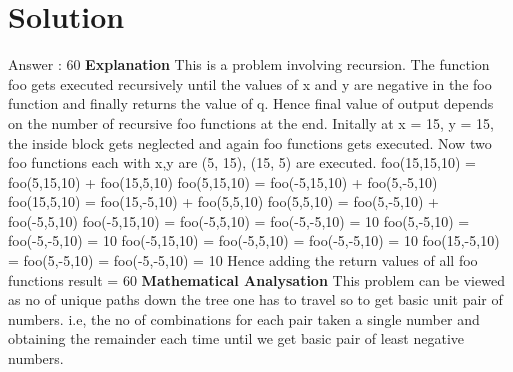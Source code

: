 \documentclass[journal,12pt,twocolumn]{IEEEtran}
\begin{document}
\section{Solution}
Answer : 60
\newline
\newline
\textbf{Explanation}
\newline
\newline
This is a problem involving recursion.
The function foo gets executed recursively until the values of x and y are negative in the foo function and finally returns the value of q. Hence final value of output depends on the number of recursive foo functions at the end. 
\newline
\newline
\newline
\newline
\newline
\newline
Initally at x = 15, y = 15, the inside block gets neglected and again foo functions gets executed.
\newline
\newline
Now two foo functions each with x,y are (5, 15),  (15, 5) are executed.
foo(15,15,10) =  foo(5,15,10) + foo(15,5,10)
\newline
\newline
foo(5,15,10)   =  foo(-5,15,10) + foo(5,-5,10)
\newline
\newline
foo(15,5,10)   =  foo(15,-5,10) + foo(5,5,10)
\newline
\newline
foo(5,5,10)  =  foo(5,-5,10) + foo(-5,5,10)
\newline
\newline
foo(-5,15,10)   =  foo(-5,5,10) = foo(-5,-5,10) = 10
\newline
\newline
foo(5,-5,10)   =  foo(-5,-5,10)  = 10
\newline
\newline
foo(-5,15,10)  = foo(-5,5,10)  = foo(-5,-5,10) = 10
\newline
\newline
foo(15,-5,10)  = foo(5,-5,10)  = foo(-5,-5,10) = 10
\newline
\newline
Hence adding the return values of all foo functions result = 60
\newline
\newline
\textbf{Mathematical Analysation}
\newline
\newline
This problem can be viewed as no of unique paths down the tree one has to travel so to get basic unit pair of numbers. i.e, the no of combinations for each pair taken a single number and obtaining the remainder each time until we get basic pair of least negative numbers.
\newpage
  
\end{document}
